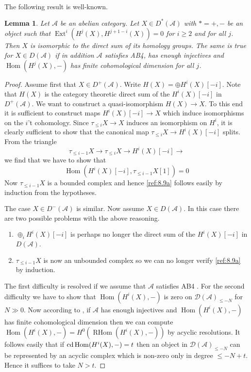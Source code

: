 \documentclass{amsproc}
\def\Ascr{{\mathcal A}}
\def\Dscr{{\mathcal D}}
\def\cd{\mathop{\text{cd}}}
\def\Ext{\operatorname {Ext}}
\def\Hom{\operatorname {Hom}}
\def\RHom{\operatorname {RHom}}
\def\r{\rightarrow}
\let\oldtext\text
\def\text#1{\oldtext{\upshape #1}}
\newtheorem{lemmas}{Lemma}[subsection]
\theoremstyle{definition}
\theoremstyle{remark}
\numberwithin{equation}{section}
\numberwithin{table}{section}
\numberwithin{figure}{section}
\begin{document}
The following result is  well-known.
\begin{lemmas}
\label{ref:8.3.4a}
 Let $\Ascr$ be an abelian category.
Let $X\in D^*(\Ascr)$ with $*=+,-$ be an object such that 
$\Ext^i(H^j(X),H^{j+1-i}(X))=0$ for $i\ge 2$
and for all $j$. Then $X$ is isomorphic to the direct sum of its
homology groups. The same is true for $X\in D(\Ascr)$ if in addition
$\Ascr$ satisfies AB4,  has enough injectives  and $\Hom(H^j(X),-)$ has
finite cohomological dimension for all $j$.
\end{lemmas}
\begin{proof} Assume first that $X\in D^+(\Ascr)$. Write $H(X)=\oplus
H^i(X)[-i]$. Note that $H(X)$ is the category theoretic  direct sum of the
$H^i(X)[-i]$ in $D^+(\Ascr)$. We want to construct a quasi-isomorphism
$H(X)\r X$. To this end it is sufficient to construct maps $H^i(X)[-i]\r
X$ which induce isomorphisms on the $i$'t cohomology. Since $\tau_{\le i}
X\r X$ induces an isomorphism on $H^i$, it is clearly sufficient to show
that the canonical map $\tau_{\le i}X \r H^i(X)[-i]$ splits. From the
triangle 
\[
\tau_{\le i-1} X\r \tau_{\le i} X \r H^i(X)[-i]\r
\]
we find that we have to show that
\begin{equation}
\label{ref:8.9a}
\Hom(H^i(X)[-i],\tau_{\le i-1}
X[1])=0
\end{equation}
Now $\tau_{\le
 i-1} X$ is a bounded complex and hence \eqref{ref:8.9a} follows easily
 by induction from the hypotheses.
 
 The case $X\in D^-(\Ascr)$ is similar. Now assume $X\in D(\Ascr)$. In
 this case there
 are  two possible problems with the above reasoning.
 \begin{enumerate}
 \item $\oplus_i H^i(X)[-i]$ is perhaps no longer the direct sum of the 
 $H^i(X)[-i]$ in $D(\Ascr)$.
 \item $\tau_{\le i-1} X$  is now an unbounded complex so we can no
 longer verify \eqref{ref:8.9a} by induction.
 \end{enumerate}
 The first difficulty is resolved if we assume that $\Ascr$ satisfies
 AB4 \cite{Neeman}. For the second difficulty we have to show that
 $\Hom(H^i(X),-)$ is zero on $\Dscr(\Ascr)_{\le -N}$ for $N\gg 0$. Now
 according to \cite[Thm 5.1, Cor. 5.3]{RD}, if $\Ascr$ has enough
 injectives and $\Hom(H^i(X),-)$ has finite cohomological dimension
 then we can compute $\Hom(H^i(X),-)=H^0(\RHom(H^i(X),-))$ by acyclic
 resolutions. It follows easily that if $\cd \Hom(H^i(X),-)=t$ then an
 object in $\Dscr(\Ascr)_{\le -N}$  can be represented by an acyclic
 complex which is non-zero only in degree $\le -N+t$. Hence it
 suffices to take $N>t$.
 \end{proof}
\end{document}
